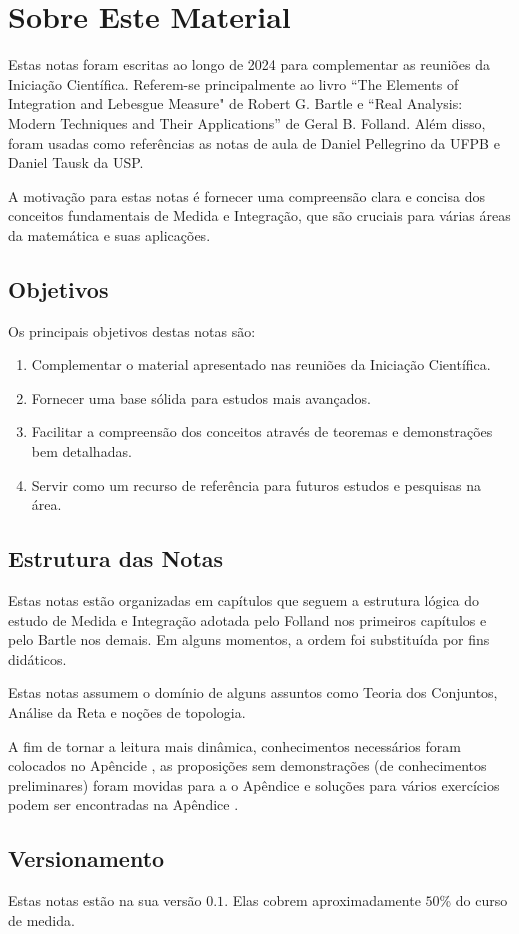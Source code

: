 \chapter*{Sobre Este Material}

Estas notas foram escritas ao longo de 2024 para complementar as reuniões da Iniciação Científica. Referem-se principalmente ao livro ``The Elements of Integration and Lebesgue Measure" de Robert G. Bartle e ``Real Analysis: Modern Techniques and Their Applications'' de Geral B. Folland. Além disso, foram usadas como referências as notas de aula de Daniel Pellegrino da UFPB e Daniel Tausk da USP.

A motivação para estas notas é fornecer uma compreensão clara e concisa dos conceitos fundamentais de Medida e Integração, que são cruciais para várias áreas da matemática e suas aplicações.

\section*{Objetivos}

Os principais objetivos destas notas são:

\begin{enumerate}
    \item Complementar o material apresentado nas reuniões da Iniciação Científica.
    \item Fornecer uma base sólida para estudos mais avançados.
    \item Facilitar a compreensão dos conceitos através de teoremas e demonstrações bem detalhadas.
    \item Servir como um recurso de referência para futuros estudos e pesquisas na área.
\end{enumerate}

\section*{Estrutura das Notas}

Estas notas estão organizadas em capítulos que seguem a estrutura lógica do estudo de Medida e Integração adotada pelo Folland nos primeiros capítulos e pelo Bartle nos demais. Em alguns momentos, a ordem foi substituída por fins didáticos.

Estas notas assumem o domínio de alguns assuntos como Teoria dos Conjuntos, Análise da Reta e noções de topologia.

A fim de tornar a leitura mais dinâmica, conhecimentos necessários foram colocados no Apêncide , as proposições sem demonstrações (de conhecimentos preliminares) foram movidas para a o Apêndice  e soluções para vários exercícios podem ser encontradas na Apêndice .

\section*{Versionamento}
Estas notas estão na sua versão $0.1$. Elas cobrem aproximadamente $50$\% do curso de medida.
